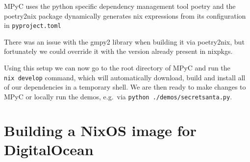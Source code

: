 MPyC uses the python specific dependency management tool
poetry\autocite{poetryDocs} and the poetry2nix package dynamically
generates nix expressions from its configuration in
\texttt{pyproject.toml}

\begin{Shaded}
\begin{Highlighting}[]
\KeywordTok{[}\KeywordTok{]}
 \OperatorTok{=} 
 \OperatorTok{=} 
 \OperatorTok{=} 
 \OperatorTok{=} \OperatorTok{[}\OperatorTok{]}
 \OperatorTok{=} 
 \OperatorTok{=} \OperatorTok{[\{}\OperatorTok{ =} \OperatorTok{\}]}

\KeywordTok{[}\KeywordTok{]}
 \OperatorTok{=} 
 \OperatorTok{=} 
 \OperatorTok{=} 
 \OperatorTok{=} 

\KeywordTok{[}\KeywordTok{]}
 \OperatorTok{=} \OperatorTok{[}\OperatorTok{]}
 \OperatorTok{=} 
\end{Highlighting}
\end{Shaded}

There was an issue with the gmpy2 library when building it via
poetry2nix, but fortunately we could override it with the version
already present in nixpkgs.

Using this setup we can now go to the root directory of MPyC and run the
\texttt{nix\ develop} command, which will automatically download, build
and install all of our dependencies in a temporary shell. We are then
ready to make changes to MPyC or locally run the demos, e.g.~via
\texttt{python\ ./demos/secretsanta.py}.

\hypertarget{building-a-nixos-image-for-digitalocean}{%
\section{Building a NixOS image for
DigitalOcean}\label{building-a-nixos-image-for-digitalocean}}

